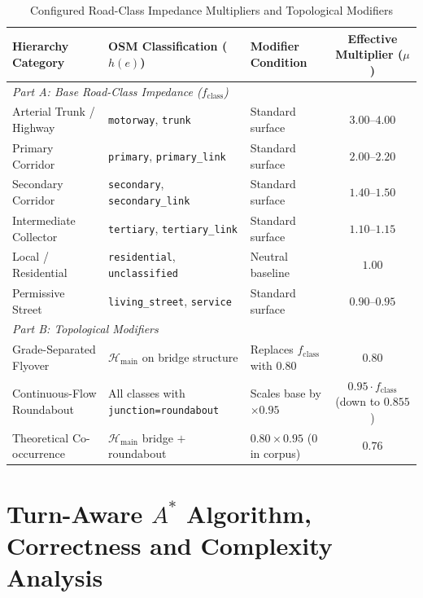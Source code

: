 \documentclass[conference]{IEEEtran}
\begin{document}
\begin{table}[t]
\caption{Configured Road-Class Impedance Multipliers and Topological Modifiers}
\label{tab:road_impedance}
\centering
\footnotesize
\begin{tabular}{lllc}
\hline
\textbf{Hierarchy Category} & \textbf{OSM Classification ($h(e)$)} & \textbf{Modifier Condition} & \textbf{Effective Multiplier ($\mu$)} \\
\hline
\multicolumn{4}{l}{\textit{Part A: Base Road-Class Impedance ($f_{\mathrm{class}}$)}} \\
Arterial Trunk / Highway & \texttt{motorway}, \texttt{trunk} & Standard surface & $3.00\text{--}4.00$ \\
Primary Corridor & \texttt{primary}, \texttt{primary\_link} & Standard surface & $2.00\text{--}2.20$ \\
Secondary Corridor & \texttt{secondary}, \texttt{secondary\_link} & Standard surface & $1.40\text{--}1.50$ \\
Intermediate Collector & \texttt{tertiary}, \texttt{tertiary\_link} & Standard surface & $1.10\text{--}1.15$ \\
Local / Residential & \texttt{residential}, \texttt{unclassified} & Neutral baseline & $1.00$ \\
Permissive Street & \texttt{living\_street}, \texttt{service} & Standard surface & $0.90\text{--}0.95$ \\
\hline
\multicolumn{4}{l}{\textit{Part B: Topological Modifiers}} \\
Grade-Separated Flyover & $\mathcal{H}_{\mathrm{main}}$ on bridge structure & Replaces $f_{\mathrm{class}}$ with $0.80$ & $0.80$ \\
Continuous-Flow Roundabout & All classes with \texttt{junction=roundabout} & Scales base by $\times 0.95$ & $0.95 \cdot f_{\mathrm{class}}$ (down to $0.855$) \\
Theoretical Co-occurrence & $\mathcal{H}_{\mathrm{main}}$ bridge $+$ roundabout & $0.80 \times 0.95$ ($0$ in corpus) & $0.76$ \\
\hline
\end{tabular}
\end{table}

\section{Turn-Aware $A^*$ Algorithm, Correctness and Complexity Analysis}
\end{document}
